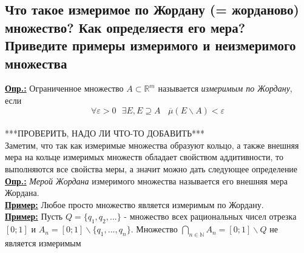 
\subsection{Что такое измеримое по Жордану (= жорданово) множество? Как определяестя его мера? Приведите примеры измеримого и неизмеримого множества}

\textbf{\underline{Опр.:} } Ограниченное множество $A \subset \mathbb{R}^m$ называется \textit{измеримым по Жордану}, если 
\[\forall \varepsilon > 0 \ \ \ \exists E, E \supseteq A \ \ \ \ \overline{\mu}(E\backslash A) < \varepsilon \] \\
***ПРОВЕРИТЬ, НАДО ЛИ ЧТО-ТО ДОБАВИТЬ***\\
Заметим, что так как измеримые множества образуют кольцо, а также внешняя мера на кольце измеримых множеств обладает свойством аддитивности, то выполняются все свойства меры, а значит можно дать следующее определение \\
\textbf{\underline{Опр.:} } \textit{Мерой Жордана} измеримого множества называется его внешняя мера Жордана. \\
\textbf{\underline{Пример:} } Любое просто множество является измеримым по Жордану. \\
\textbf{\underline{Пример:} } Пусть $Q = \{q_1, q_2, ...\}$ - множество всех рациональных чисел отрезка $[0;1]$ и $A_n = [0;1] \backslash \{q_1, ..., q_n\}$. Множество $\bigcap\limits_{n\in\mathbb{N}} A_n = [0; 1] \backslash Q$ не является измеримым


